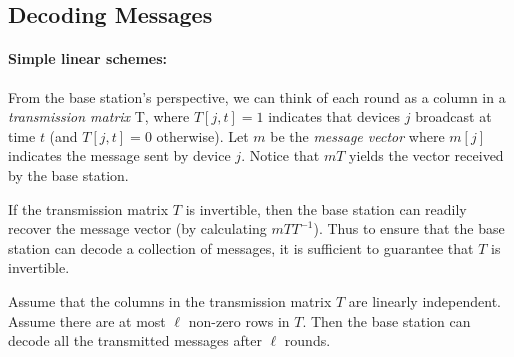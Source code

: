 
\subsection{Decoding Messages}

\paragraph{Simple linear schemes:} From the base station's perspective, we can think of each round as a column in a \emph{transmission matrix} T, where $T[j, t] = 1$ indicates that devices $j$ broadcast at time $t$ (and $T[j, t]=0$ otherwise).  Let $m$ be the \emph{message vector} where $m[j]$ indicates the message sent by device $j$.  Notice that $mT$ yields the vector received by the base station.  

If the transmission matrix $T$ is invertible, then the base station can readily recover the message vector (by calculating $mTT^{-1}$).  Thus to ensure that the base station can decode a collection of messages, it is sufficient to guarantee that $T$ is invertible.   

\begin{claim}
Assume that the columns in the transmission matrix $T$ are linearly independent.  Assume there are at most $\ell$ non-zero rows in $T$.  Then the base station can decode all the transmitted messages after $\ell$ rounds.
\end{claim}

